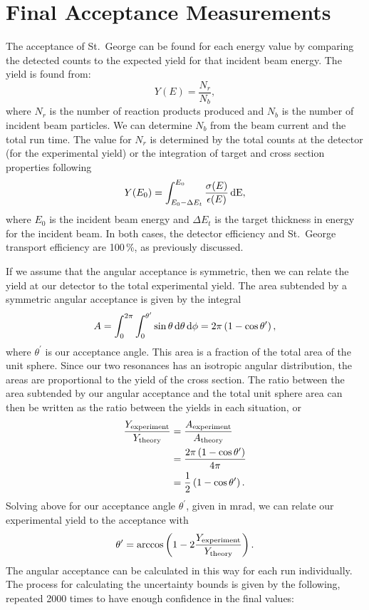 \section{Final Acceptance Measurements}
\label{sec:final-acceptance-measurements}

The acceptance of St.\ George can be found for each energy value by
comparing the detected counts to the expected yield for that incident
beam energy. The yield is found from:
\begin{equation}
    Y(E) = \frac{N_r}{N_b},
\end{equation}
where $N_r$ is the number of reaction products produced and $N_b$ is the
number of incident beam particles. We can determine $N_b$ from the beam
current and the total run time. The value for $N_r$ is determined by the
total counts at the detector (for the experimental yield) or the
integration of target and cross section properties following
\begin{equation}
    \label{eq:yield}
    Y(E_0) = \int^{E_0}_{E_0 - \Delta E_t} \frac{\sigma(E)}{\epsilon(E)}\,\rm{d}E,
\end{equation}
where $E_0$ is the incident beam energy and $\Delta E_t$ is the target
thickness in energy for the incident beam. In both cases, the detector
efficiency and St.\ George transport efficiency are 100\,\%, as
previously discussed.

If we assume that the angular acceptance is symmetric, then we can relate the yield at our detector to the total experimental yield. The area subtended by a symmetric angular acceptance is given by the integral
\[
    A = \int_0^{2\pi}\int_0^{\theta^{\prime}} \sin\theta\,\rm{d}\theta\,\rm{d}\phi
     = 2\pi\left(1 - \cos\theta^{\prime}\right),
\]
where $\theta^{\prime}$ is our acceptance angle. This area is a fraction of the total area of the unit sphere. Since our two resonances has an isotropic angular distribution, the areas are proportional to the yield of the cross section. The ratio between the area subtended by our angular acceptance and the total unit sphere area can then be written as the ratio between the yields in each situation, or
\begin{align*}
    \frac{Y_{\rm experiment}}{Y_{\rm theory}} &= \frac{A_{\rm experiment}}{A_{\rm theory}} \\
    &= \frac{2\pi\left(1 - \cos\theta^{\prime}\right)}{4\pi} \\
    &= \frac{1}{2}\left(1 - \cos\theta^{\prime}\right).
\end{align*}
Solving above for our acceptance angle $\theta^{\prime}$, given in mrad, we can relate our experimental yield to the acceptance with
\begin{equation}
    \label{eq:acceptance}
    \theta^{\prime} = \arccos\left(1 - 2 \frac{Y_{\rm experiment}}
        {Y_{\rm theory}}\right).
\end{equation}
The angular acceptance can be calculated in this way for each run
individually. The process for calculating the uncertainty bounds is
given by the following, repeated 2000 times to have enough confidence in
the final values:

